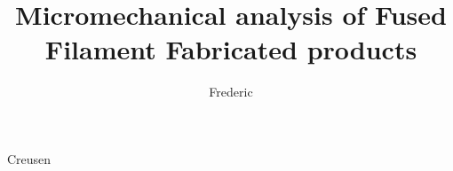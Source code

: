 \documentclass{dissertation}
\begin{document}
\title[a Representative Volume Element approach]{Micromechanical analysis of Fused Filament Fabricated products}  
\author{Frederic}{Creusen} %

\frontmatter






\tableofcontents

\mainmatter

\thumbtrue







 
 



\appendix

%
%

\thumbfalse

\end{document}

